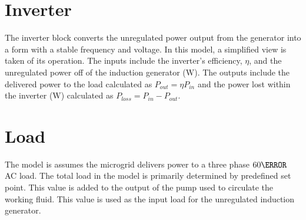 \section{Inverter}
The inverter block converts the unregulated power output from the generator into a form with a stable frequency and voltage. In this model, a simplified view is taken of its operation. The inputs include the inverter's efficiency, $\eta$, and the unregulated power off of the induction generator ($\si{\watt}$). The outputs include the delivered power to the load calculated as $P_{out} = \eta P_{in}$  and the power lost within the inverter ($\si{\watt}$) calculated as $P_{loss} = P_{in} - P_{out}$.

\section{Load}
The model is assumes the microgrid delivers power to a three phase $\si{60}{\hertz}$ AC load. The total load in the model is primarily determined by predefined set point. This value is added to the output of the pump used to circulate the working fluid. This value is used as the input load for the unregulated induction generator.

